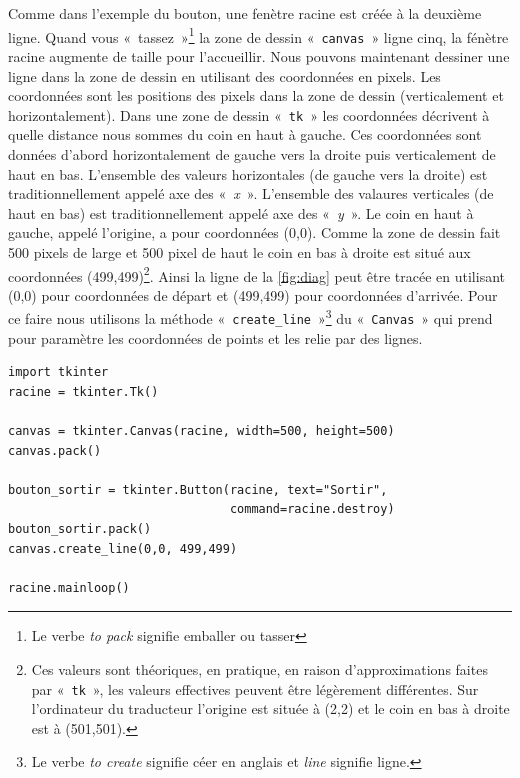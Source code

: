 Comme dans l'exemple du bouton, une fenètre racine est créée à la deuxième ligne. Quand vous «~tassez~»\footnote{Le verbe \emph{to pack} signifie emballer ou tasser} la zone de dessin «~\texttt{canvas}~» ligne cinq, la fénètre racine augmente de taille pour l'accueillir. Nous pouvons maintenant dessiner une ligne dans la zone de dessin en utilisant des coordonnées en pixels. Les coordonnées sont les positions des pixels dans la zone de dessin (verticalement et horizontalement). Dans une zone de dessin «~\texttt{tk}~»  les coordonnées décrivent à quelle distance nous sommes du coin en haut à gauche. Ces coordonnées sont données d'abord horizontalement de gauche vers la droite puis verticalement de haut en bas. L'ensemble des valeurs horizontales (de gauche vers la droite) est traditionnellement appelé axe des «~\emph{x}~». L'ensemble des valaures verticales (de haut en bas) est traditionnellement appelé axe des «~\emph{y}~». Le coin en haut à gauche, appelé l'origine, a pour coordonnées (0,0). Comme la zone de dessin fait 500 pixels de large et 500 pixel de haut le coin en bas à droite est situé aux coordonnées (499,499)\footnote{Ces valeurs sont théoriques, en pratique, en raison d'approximations faites par «~\texttt{tk}~», les valeurs effectives peuvent être légèrement différentes. Sur l'ordinateur du traducteur l'origine est située à (2,2) et le coin en bas à droite est à (501,501).}. Ainsi la ligne de la \autoref{fig:diag} peut être tracée en utilisant (0,0) pour coordonnées de départ et (499,499) pour coordonnées d'arrivée. Pour ce faire nous utilisons la méthode «~\texttt{create\_line}~»\footnote{Le verbe \emph{to create} signifie céer en anglais et \emph{line} signifie ligne.} du «~\texttt{Canvas}~» qui prend pour paramètre les coordonnées de points et les relie par des lignes. 
\begin{Verbatim}[frame=single,rulecolor=\color{mbleu}, label=à taper]
import tkinter
racine = tkinter.Tk()

canvas = tkinter.Canvas(racine, width=500, height=500)
canvas.pack()

bouton_sortir = tkinter.Button(racine, text="Sortir",
                               command=racine.destroy)
bouton_sortir.pack()
canvas.create_line(0,0, 499,499)

racine.mainloop()
\end{Verbatim}

